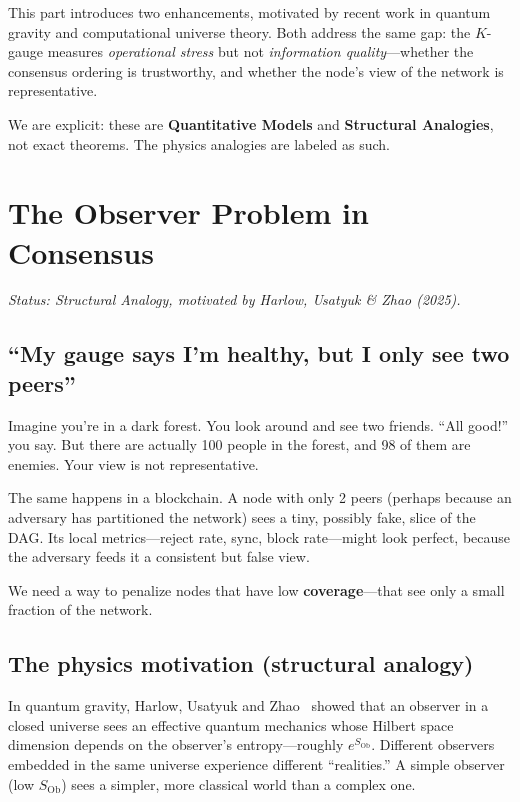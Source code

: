 \documentclass[11pt,a4paper]{article}
\begin{document}
This part introduces two enhancements, motivated by recent work in quantum gravity and computational universe theory. Both address the same gap: the $K$-gauge measures \emph{operational stress} but not \emph{information quality}---whether the consensus ordering is trustworthy, and whether the node's view of the network is representative.

We are explicit: these are \textcolor{hardcoded}{\textbf{Quantitative Models}} and \textcolor{theoretical}{\textbf{Structural Analogies}}, not exact theorems. The physics analogies are labeled as such.

\section{The Observer Problem in Consensus}
\label{sec:observer}

\emph{Status: \textcolor{theoretical}{Structural Analogy}, motivated by Harlow, Usatyuk \& Zhao (2025).}

\subsection{``My gauge says I'm healthy, but I only see two peers''}

Imagine you're in a dark forest. You look around and see two friends. ``All good!'' you say. But there are actually 100 people in the forest, and 98 of them are enemies. Your view is not representative.

The same happens in a blockchain. A node with only 2 peers (perhaps because an adversary has partitioned the network) sees a tiny, possibly fake, slice of the DAG. Its local metrics---reject rate, sync, block rate---might look perfect, because the adversary feeds it a consistent but false view.

We need a way to penalize nodes that have low \textbf{coverage}---that see only a small fraction of the network.

\subsection{The physics motivation (structural analogy)}

In quantum gravity, Harlow, Usatyuk and Zhao~\cite{harlow2025} showed that an observer in a closed universe sees an effective quantum mechanics whose Hilbert space dimension depends on the observer's entropy---roughly $e^{S_{\text{Ob}}}$. Different observers embedded in the same universe experience different ``realities.'' A simple observer (low $S_{\text{Ob}}$) sees a simpler, more classical world than a complex one.
\end{document}

